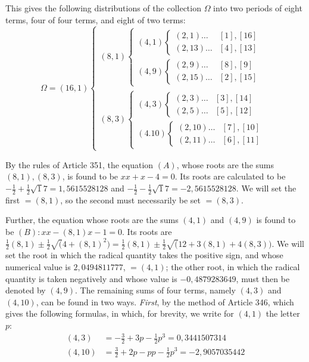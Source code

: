 This gives the following distributions of the collection \(\Omega\) into two periods of eight terms, four of four terms, and eight of two terms: {\small\setlength{\arraycolsep}{2pt}\[\Omega=(16,1)\left\{\begin{array}{l}(8,1)\left\{\begin{array}{l}(4,1)\left\{\begin{array}{ll}(2,1)\ldots&[1],[16]\\(2,13)\ldots&[4],[13]\end{array}\right.\\[4pt](4,9)\left\{\begin{array}{ll}(2,9)\ldots&[8],[9]\\(2,15)\ldots&[2],[15]\end{array}\right.\end{array}\right.\\[8pt](8,3)\left\{\begin{array}{l}(4,3)\left\{\begin{array}{ll}(2,3)\ldots&[3],[14]\\(2,5)\ldots&[5],[12]\end{array}\right.\\[4pt](4.10)\left\{\begin{array}{ll}(2,10)\ldots&[7],[10]\\(2,11)\ldots&[6],[11]\end{array}\right.\end{array}\right.\end{array}\right.\]}

By the rules of Article 351, the equation \((A)\), whose roots are the sums \((8,1),\allowbreak (8,3)\), is found to be \(xx+x-4=0\). Its roots are calculated to be \(-\frac12+\frac12\surd 17=1{,}5615528128\) and \(-\frac12-\frac12\surd 17=-2{,}5615528128\). We will set the first \(=(8,1)\), so the second must necessarily be set \(=(8,3)\).

Further, the equation whose roots are the sums \((4,1)\) and \((4,9)\) is found to be \((B):xx-(8,1)x-1=0\). Its roots are \(\frac12(8,1)\pm\frac12\surd(4+(8,1)^2)=\frac12(8,1)\pm\frac12\surd(12+3(8,1)+4(8,3))\). We will set the root in which the radical quantity takes the positive sign, and whose numerical value is \(2{,}0494811777\), \(=(4,1)\); the other root, in which the radical quantity is taken negatively and whose value is \(-0{,}4879283649\), must then be denoted by \((4,9)\). The remaining sums of four terms, namely \((4,3)\) and \((4,10)\), can be found in two ways. \textit{First}, by the method of Article 346, which gives the following formulas, in which, for brevity, we write for \((4,1)\) the letter \(p\): \[\begin{aligned}(4,3)&=-\frac32+3p-\frac12p^3=0{,}3441507314\\(4,10)&=\frac32+2p-pp-\frac12p^3=-2{,}9057035442\end{aligned}\]

